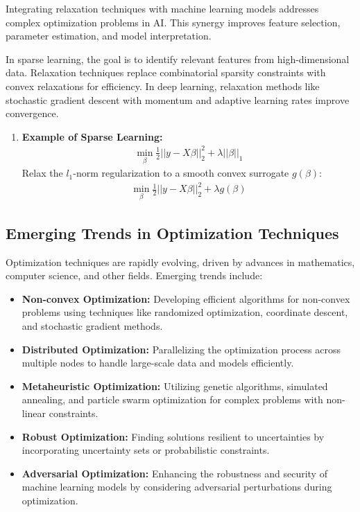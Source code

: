 \documentclass[12pt]{book} %
\begin{document}
Integrating relaxation techniques with machine learning models addresses complex optimization problems in AI. This synergy improves feature selection, parameter estimation, and model interpretation.

In sparse learning, the goal is to identify relevant features from high-dimensional data. Relaxation techniques replace combinatorial sparsity constraints with convex relaxations for efficiency. In deep learning, relaxation methods like stochastic gradient descent with momentum and adaptive learning rates improve convergence.

\begin{enumerate}
    \item \textbf{Example of Sparse Learning:}
    \begin{align*}
        \min_{\beta} \frac{1}{2} ||y - X\beta||_2^2 + \lambda ||\beta||_1
    \end{align*}
    Relax the \(l_1\)-norm regularization to a smooth convex surrogate \(g(\beta)\):
    \begin{align*}
        \min_{\beta} \frac{1}{2} ||y - X\beta||_2^2 + \lambda g(\beta)
    \end{align*}
\end{enumerate}

\subsection{Emerging Trends in Optimization Techniques}

Optimization techniques are rapidly evolving, driven by advances in mathematics, computer science, and other fields. Emerging trends include:

\begin{itemize}
    \item \textbf{Non-convex Optimization:} Developing efficient algorithms for non-convex problems using techniques like randomized optimization, coordinate descent, and stochastic gradient methods.
    \item \textbf{Distributed Optimization:} Parallelizing the optimization process across multiple nodes to handle large-scale data and models efficiently.
    \item \textbf{Metaheuristic Optimization:} Utilizing genetic algorithms, simulated annealing, and particle swarm optimization for complex problems with non-linear constraints.
    \item \textbf{Robust Optimization:} Finding solutions resilient to uncertainties by incorporating uncertainty sets or probabilistic constraints.
    \item \textbf{Adversarial Optimization:} Enhancing the robustness and security of machine learning models by considering adversarial perturbations during optimization.
\end{itemize}
\end{document}
